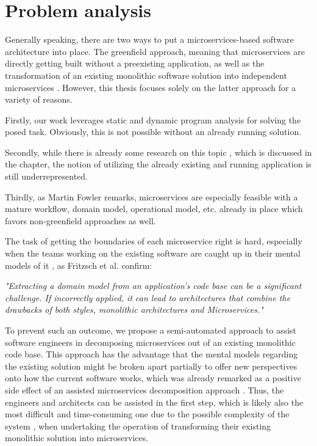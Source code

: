 \documentclass[12pt,a4paper]{report}
\begin{document}
\section{Problem analysis}

Generally speaking, there are two ways to put a microservices\hyp based
software architecture into place. The greenfield approach, meaning that
microservices are directly getting built without a preexisting application,
as well as the transformation of an existing monolithic software solution
into independent microservices \cite{fowler-break-monolith}.
However, this thesis focuses solely on the latter approach for a variety of reasons.

Firstly, our work leverages static and dynamic program analysis for solving
the posed task. Obviously, this is not possible without an already running solution.

Secondly, while there is already some research on this topic \cite{fritzsch2018monolith},
which is discussed in the \textit{} chapter, the notion
of utilizing the already existing and running application is still underrepresented.

Thirdly, as Martin Fowler remarks, microservices are especially feasible
with a mature workflow, domain model, operational model, etc. already
in place \cite{fowler-monolith-first, fowler-microservices-tradeoffs}
which favors non\hyp greenfield approaches as well.

The task of getting the boundaries of each microservice right is hard,
especially when the teams working on the existing software
are caught up in their mental models of it \cite{latoza2006maintaining},
as Fritzsch et al. confirm:
\begin{displayquote}
\emph{"Extracting a domain model from an application's code base
can be a significant challenge. If incorrectly applied,
it can lead to architectures that combine the drawbacks of both styles,
monolithic architectures and Microservices."}~\cite{fritzsch2018monolith}
\end{displayquote}
To prevent such an outcome, we propose a semi-automated approach to assist
software engineers in decomposing microservices out of an existing monolithic code base.
This approach has the advantage that the mental models regarding the existing
solution might be broken apart partially to offer new perspectives onto how
the current software works, which was already remarked as a positive side effect
of an assisted microservices decomposition approach \cite{gysel2016service}.
Thus, the engineers and architects can be assisted in the first step,
which is likely also the most difficult and time-consuming one due to the possible
complexity of the system \cite{fritzsch2018monolith, france2007model},
when undertaking the operation of transforming their existing
monolithic solution into microservices.
\end{document}
